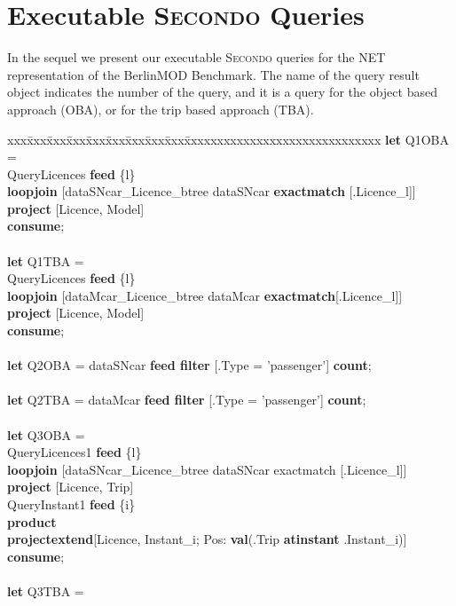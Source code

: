 \documentclass[a4paper]{article}
\newcommand{\secondo}{\textsc{Secondo}}
\newcommand{\bmodb} {BerlinMOD Benchmark}
\newcommand{\op}[1]{\textbf{#1}}
\begin{document}
\section{Executable \secondo{} Queries}
In the sequel we present our executable \secondo{} queries for the NET representation
of the \bmodb{}. The name of the query result object indicates the number of
the query, and it is a query for the object based approach (OBA), or for the
trip based approach (TBA).
\begin{scriptsize}
\begin{tabbing}
xxx\=xxx\=xxx\=xxx\=xxx\=xxx\=xxx\=xxx\=xxx\=xxxxxxxxxxxxxxxxxxxxxxxxxxxxxx\kill
\op{let} Q1OBA =\\
\>QueryLicences \op{feed} \{l\}\\
\>\>\op{loopjoin} [dataSNcar\_Licence\_btree dataSNcar \op{exactmatch} [.Licence\_l]]\\
\>\>\op{project} [Licence, Model]\\
\op{consume};\\
\\
\op{let} Q1TBA =\\
\>QueryLicences \op{feed} \{l\}\\
\>\>\op{loopjoin} [dataMcar\_Licence\_btree dataMcar \op{exactmatch}[.Licence\_l]]\\
\>\>\op{project} [Licence, Model]\\
\op{consume};\\
\\
\op{let} Q2OBA = dataSNcar \op{feed filter} [.Type = 'passenger'] \op{count};\\
\\
\op{let} Q2TBA = dataMcar \op{feed filter} [.Type = 'passenger'] \op{count};\\
\\
\op{let} Q3OBA =\\
\>QueryLicences1 \op{feed} \{l\}\\
\>\>\op{loopjoin} [dataSNcar\_Licence\_btree dataSNcar exactmatch [.Licence\_l]]\\
\>\>\op{project} [Licence, Trip]\\
\>QueryInstant1 \op{feed} \{i\}\\
\>\op{product}\\
\>\op{projectextend}[Licence, Instant\_i; Pos: \op{val}(.Trip \op{atinstant} .Instant\_i)]\\
\op{consume};\\
\\
\op{let} Q3TBA =\\

\end{tabbing}
\end{scriptsize}
\end{document}
